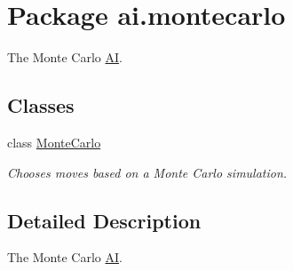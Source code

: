 \hypertarget{namespaceai_1_1montecarlo}{
\section{Package ai.montecarlo}
\label{namespaceai_1_1montecarlo}
}


The Monte Carlo \hyperlink{classai_1_1_a_i}{AI}.  


\subsection*{Classes}
\begin{DoxyCompactItemize}
\item 
class \hyperlink{classai_1_1montecarlo_1_1_monte_carlo}{MonteCarlo}
\begin{DoxyCompactList}\small\item\em Chooses moves based on a Monte Carlo simulation. \end{DoxyCompactList}\end{DoxyCompactItemize}


\subsection{Detailed Description}
The Monte Carlo \hyperlink{classai_1_1_a_i}{AI}. 